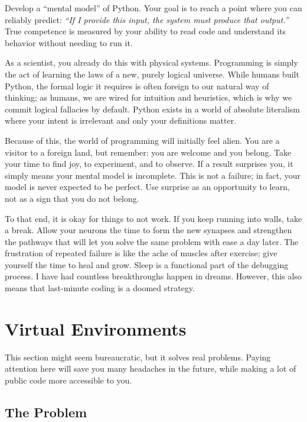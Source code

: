\begin{tip}
Develop a ``mental model'' of Python. Your goal is to reach a point where you can reliably predict: \textit{``If I provide this input, the system must produce that output.''} True competence is measured by your ability to read code and understand its behavior without needing to run it.

As a scientist, you already do this with physical systems. Programming is simply the act of learning the laws of a new, purely logical universe. While humans built Python, the formal logic it requires is often foreign to our natural way of thinking; as humans, we are wired for intuition and heuristics, which is why we commit logical fallacies by default. Python exists in a world of absolute literalism where your intent is irrelevant and only your definitions matter.

Because of this, the world of programming will initially feel alien. You are a visitor to a foreign land, but remember: you are welcome and you belong. Take your time to find joy, to experiment, and to observe. If a result surprises you, it simply means your mental model is incomplete. This is not a failure; in fact, your model is never expected to be perfect. Use surprise as an opportunity to learn, not as a sign that you do not belong.

To that end, it is okay for things to not work. If you keep running into walls, take a break. Allow your neurons the time to form the new synapses and strengthen the pathways that will let you solve the same problem with ease a day later. The frustration of repeated failure is like the ache of muscles after exercise; give yourself the time to heal and grow. Sleep is a functional part of the debugging process. I have had countless breakthroughs happen in dreams. However, this also means that last-minute coding is a doomed strategy.
\end{tip}


\section{Virtual Environments}
\label{sec:venv}

This section might seem bureaucratic, but it solves real problems. Paying attention here will save you many headaches in the future, while making a lot of public code more accessible to you.

\subsection{The Problem}

